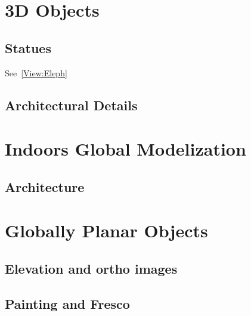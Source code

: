 

\section{3D Objects}

\subsection{Statues}
See~\ref{View:Eleph}

\subsection{Architectural Details}




\section{Indoors Global Modelization}
\subsection{Architecture}



\section{Globally Planar Objects}

\subsection{Elevation and ortho images}
\subsection{Painting and Fresco}
